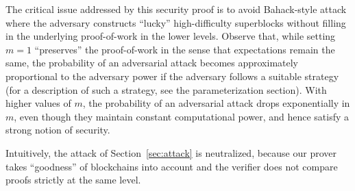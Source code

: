 

\begin{remark}
\label{rmk.variance}
The critical issue addressed by this security proof is to avoid Bahack-style
attack \cite{bahack} where the adversary constructs ``lucky'' high-difficulty
superblocks without filling in the underlying proof-of-work in the lower
levels. Observe that, while setting $m = 1$ ``preserves'' the proof-of-work in
the sense that expectations remain the same, the probability of an adversarial
attack becomes approximately proportional to the adversary power if the
adversary follows a suitable strategy (for a description of such a strategy,
see the parameterization section). With higher values of $m$, the probability of
an adversarial attack drops exponentially in $m$, even though they maintain constant
computational power, and hence satisfy a strong notion of security.
\end{remark}

\begin{remark}
Intuitively, the attack of Section~\ref{sec:attack} is neutralized, because
our prover takes ``goodness'' of blockchains into account and the verifier
does not compare proofs strictly at the same level.
\end{remark}
